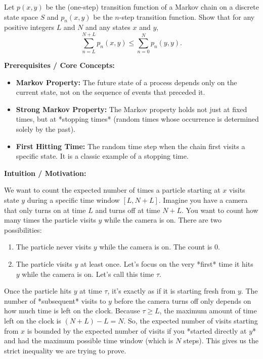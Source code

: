\begin{exercise}\label{probability:2023:2}
Let $p(x,y)$ be the (one-step) transition function of a Markov chain on a discrete state space $S$ and $p_n(x,y)$ be the $n$-step transition function. Show that for any positive integers $L$ and $N$ and any states $x$ and $y$,
\[
\sum_{n=L}^{N+L} p_n(x,y) \leq \sum_{n=0}^N p_n(y,y).
\]
\end{exercise}

\begin{solution}
\textbf{Prerequisites / Core Concepts:}
\begin{itemize}
    \item \textbf{Markov Property:} The future state of a process depends only on the current state, not on the sequence of events that preceded it.
    \item \textbf{Strong Markov Property:} The Markov property holds not just at fixed times, but at *stopping times* (random times whose occurrence is determined solely by the past).
    \item \textbf{First Hitting Time:} The random time step when the chain first visits a specific state. It is a classic example of a stopping time.
\end{itemize}

\textbf{Intuition / Motivation:}

We want to count the expected number of times a particle starting at $x$ visits state $y$ during a specific time window $[L, N+L]$.
Imagine you have a camera that only turns on at time $L$ and turns off at time $N+L$. You want to count how many times the particle visits $y$ while the camera is on.
There are two possibilities:
\begin{enumerate}
    \item The particle never visits $y$ while the camera is on. The count is 0.
    \item The particle visits $y$ at least once. Let's focus on the very *first* time it hits $y$ while the camera is on. Let's call this time $\tau$.
\end{enumerate}
Once the particle hits $y$ at time $\tau$, it's exactly as if it is starting fresh from $y$. The number of *subsequent* visits to $y$ before the camera turns off only depends on how much time is left on the clock.
Because $\tau \geq L$, the maximum amount of time left on the clock is $(N+L) - L = N$.
So, the expected number of visits starting from $x$ is bounded by the expected number of visits if you *started directly at $y$* and had the maximum possible time window (which is $N$ steps). This gives us the strict inequality we are trying to prove.


\end{solution}
